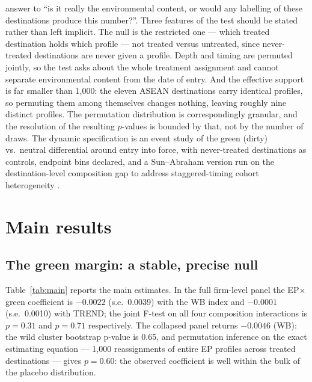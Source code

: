 \documentclass[12pt]{article}
\begin{document}
answer to ``is it really the environmental content, or would any labelling of these
destinations produce this number?''. Three features of the test should be stated rather
than left implicit. The null is the restricted one --- which treated destination holds
which profile --- not treated versus untreated, since never-treated destinations are
never given a profile. Depth and timing are permuted jointly, so the test asks about the
whole treatment assignment and cannot separate environmental content from the date of
entry. And the effective support is far smaller than 1{,}000: the eleven ASEAN
destinations carry identical profiles, so permuting them among themselves changes
nothing, leaving roughly nine distinct profiles. The permutation distribution is
correspondingly granular, and the resolution of the resulting $p$-values is bounded by
that, not by the number of draws. The dynamic specification is an event study of the
green (dirty) vs.\ neutral differential around entry into force, with never-treated
destinations as controls, endpoint bins declared, and a Sun--Abraham version
\citep{sun2021} run on the destination-level composition gap to address staggered-timing
cohort heterogeneity \citep{goodmanbacon2021, dechaisemartin2020, callaway2021}.

\section{Main results}\label{sec:results}

\subsection{The green margin: a stable, precise null}

Table~\ref{tab:main} reports the main estimates. In the full firm-level panel the
EP$\times$green coefficient is $-0.0022$ (s.e.\ 0.0039) with the WB index and $-0.0001$
(s.e.\ 0.0010) with TREND; the joint F-test on all four composition interactions is
$p=0.31$ and $p=0.71$ respectively. The collapsed panel returns $-0.0046$ (WB): the wild
cluster bootstrap p-value is 0.65, and permutation inference on the exact estimating
equation --- 1{,}000 reassignments of entire EP profiles across treated destinations
--- gives $p=0.60$: the observed coefficient is well within the bulk of the placebo
distribution.
\end{document}
